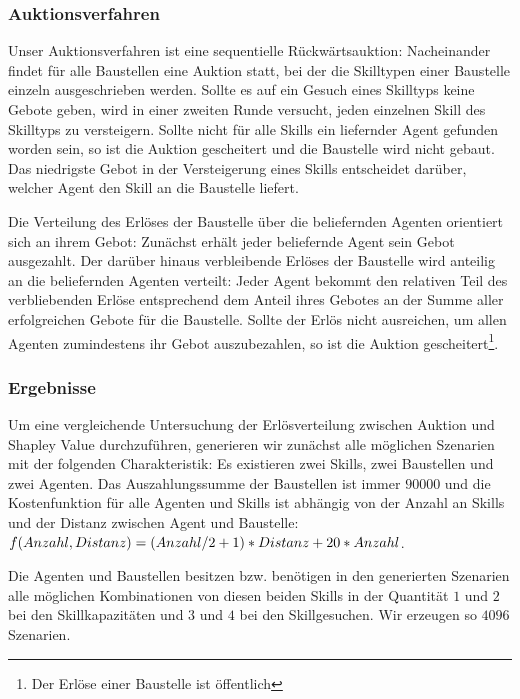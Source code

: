\subsubsection{Auktionsverfahren}
Unser Auktionsverfahren ist eine sequentielle Rückwärtsauktion: Nacheinander findet für alle Baustellen eine Auktion statt, bei der die Skilltypen einer Baustelle einzeln ausgeschrieben werden. Sollte es auf ein Gesuch eines Skilltyps keine Gebote geben, wird in einer zweiten Runde versucht, jeden einzelnen Skill des Skilltyps zu versteigern. Sollte nicht für alle Skills ein liefernder Agent gefunden worden sein, so ist die Auktion gescheitert und die Baustelle wird nicht gebaut. Das niedrigste Gebot in der Versteigerung eines Skills entscheidet darüber, welcher Agent den Skill an die Baustelle liefert.

Die Verteilung des Erlöses der Baustelle über die beliefernden Agenten orientiert sich an ihrem Gebot: Zunächst erhält jeder beliefernde Agent sein Gebot ausgezahlt. Der darüber hinaus verbleibende Erlöses der Baustelle wird anteilig an die beliefernden Agenten verteilt: Jeder Agent bekommt den relativen Teil des verbliebenden Erlöse entsprechend dem Anteil ihres Gebotes an der Summe aller erfolgreichen Gebote für die Baustelle. Sollte der Erlös nicht ausreichen, um allen Agenten zumindestens ihr Gebot auszubezahlen, so ist die Auktion gescheitert\footnote{Der Erlöse einer Baustelle ist öffentlich}.

\subsubsection{Ergebnisse}
Um eine vergleichende Untersuchung der Er\-lös\-ver\-tei\-lung zwischen Auktion und Shapley Value durchzuführen, generieren wir zunächst alle möglichen Szenarien mit der folgenden Charakteristik: Es existieren zwei Skills, zwei Baustellen und zwei Agenten. Das Auszahlungssumme der Baustellen ist immer $90000$ und die Kostenfunktion für alle Agenten und Skills ist abhängig von der Anzahl an Skills und der Distanz zwischen Agent und Baustelle: $f(Anzahl, \-Distanz)\- = (Anzahl/2+1)\-*Distanz\-+20*Anzahl$.

Die Agenten und Baustellen besitzen bzw. benötigen in den generierten Szenarien alle möglichen Kombinationen von diesen beiden Skills in der Quantität $1$ und $2$ bei den Skillkapazitäten und $3$ und $4$ bei den Skillgesuchen. Wir erzeugen so $4096$ Szenarien. 

